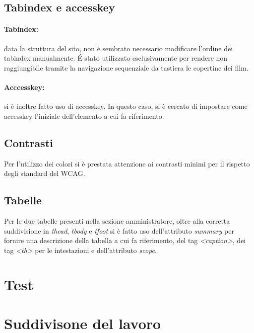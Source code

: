 \documentclass[a4paper]{article}
\begin{document}
\subsection{Tabindex e accesskey}

\paragraph*{Tabindex:}
data la struttura del sito, non è sembrato necessario modificare l’ordine dei tabindex manualmente.
É stato utilizzato esclusivamente per rendere non raggiungibile tramite la navigazione sequenziale da tastiera le copertine dei film.

\paragraph*{Acccesskey:}
si è inoltre fatto uso di accesskey. In questo caso, si è cercato di impostare come accesskey l'iniziale dell'elemento a cui fa riferimento.

\subsection{Contrasti}

Per l'utilizzo dei colori si è prestata attenzione ai contrasti minimi per il rispetto degli standard del WCAG.

\subsection{Tabelle}
Per le due tabelle presenti nella sezione amministratore, oltre alla corretta suddivisione in \textit{thead}, \textit{tbody} e \textit{tfoot} si è fatto uso dell'attributo \textit{summary} per fornire una descrizione della tabella a cui fa riferimento, del tag \textit{<caption>}, dei tag \textit{<th>} per le intestazioni e dell'attributo \textit{scope}.

\section{Test}

\section{Suddivisone del lavoro}
\end{document}

